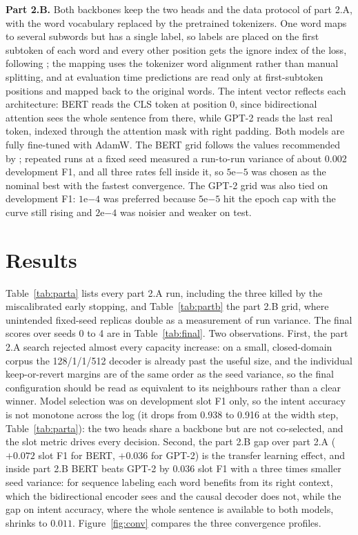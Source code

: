 \documentclass[a4paper]{article}
\begin{document}
\textbf{Part 2.B.} Both backbones keep the two heads and the data protocol of part 2.A, with the word vocabulary replaced by the pretrained tokenizers. One word maps to several subwords but has a single label, so labels are placed on the first subtoken of each word and every other position gets the ignore index of the loss, following \cite{chen2019bertjoint}; the mapping uses the tokenizer word alignment rather than manual splitting, and at evaluation time predictions are read only at first-subtoken positions and mapped back to the original words. The intent vector reflects each architecture: BERT reads the CLS token at position 0, since bidirectional attention sees the whole sentence from there, while GPT-2 reads the last real token, indexed through the attention mask with right padding. Both models are fully fine-tuned with AdamW. The BERT grid follows the values recommended by \cite{devlin2019bert}; repeated runs at a fixed seed measured a run-to-run variance of about 0.002 development F1, and all three rates fell inside it, so $5\mathrm{e}{-5}$ was chosen as the nominal best with the fastest convergence. The GPT-2 grid was also tied on development F1: $1\mathrm{e}{-4}$ was preferred because $5\mathrm{e}{-5}$ hit the epoch cap with the curve still rising and $2\mathrm{e}{-4}$ was noisier and weaker on test.

\section{Results}
Table~\ref{tab:parta} lists every part 2.A run, including the three killed by the miscalibrated early stopping, and Table~\ref{tab:partb} the part 2.B grid, where unintended fixed-seed replicas double as a measurement of run variance. The final scores over seeds 0 to 4 are in Table~\ref{tab:final}. Two observations. First, the part 2.A search rejected almost every capacity increase: on a small, closed-domain corpus the 128/1/1/512 decoder is already past the useful size, and the individual keep-or-revert margins are of the same order as the seed variance, so the final configuration should be read as equivalent to its neighbours rather than a clear winner. Model selection was on development slot F1 only, so the intent accuracy is not monotone across the log (it drops from 0.938 to 0.916 at the width step, Table~\ref{tab:parta}): the two heads share a backbone but are not co-selected, and the slot metric drives every decision. Second, the part 2.B gap over part 2.A ($+0.072$ slot F1 for BERT, $+0.036$ for GPT-2) is the transfer learning effect, and inside part 2.B BERT beats GPT-2 by $0.036$ slot F1 with a three times smaller seed variance: for sequence labeling each word benefits from its right context, which the bidirectional encoder sees and the causal decoder does not, while the gap on intent accuracy, where the whole sentence is available to both models, shrinks to $0.011$. Figure~\ref{fig:conv} compares the three convergence profiles.
\end{document}
